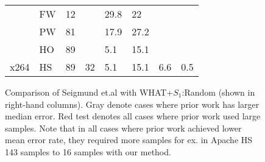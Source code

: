 \begin{figure*}[!t]
\begin{tabular}{|l|l|l|l|l|l|l|l|}
                                   & FW                              & 12                              &                                            & \cellcolor[HTML]{C0C0C0}29.8 & \cellcolor[HTML]{C0C0C0}22   &                       &                       \\ \cline{2-3} \cline{5-6}
                                   & PW                              & \cellcolor[HTML]{FD6864}81                              &                                            & \cellcolor[HTML]{C0C0C0}17.9 & \cellcolor[HTML]{C0C0C0}27.2 &                       &                       \\ \cline{2-3} \cline{5-6}
                                   & HO                              & \cellcolor[HTML]{FD6864}89                              &                                            & 5.1                          & 15.1                         &                       &                       \\ \cline{2-3} \cline{5-6}
\multirow{-4}{*}{x264}             & HS                              & \cellcolor[HTML]{FD6864}89                              & \multirow{-4}{*}{32}                       & 5.1                          & 15.1                         & \multirow{-4}{*}{6.6} & \multirow{-4}{*}{0.5} \\ \hline
\end{tabular}
\caption{Comparison of
Seigmund et.al \cite{siegmund2012predicting} with WHAT+$S_1$:Random 
(shown in right-hand columns). Gray   denote cases where prior work has larger median error. Red test denotes all cases where prior work used large samples. Note that in all cases where prior work achieved lower mean error rate, they required more samples for ex. in Apache HS 143 samples to 16 samples with our method.
}\label{fig:vs2012}
\end{figure*}
